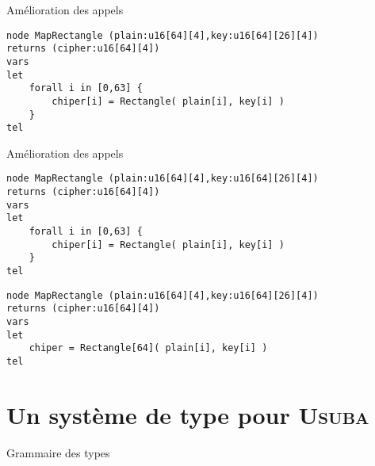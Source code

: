 \documentclass{beamer}
\newcommand{\Usuba}{\textsc{Usuba}}
\begin{document}
\begin{frame}[fragile]{Amélioration des appels}
\scriptsize
\begin{lstlisting}
node MapRectangle (plain:u16[64][4],key:u16[64][26][4])
returns (cipher:u16[64][4])
vars
let
    forall i in [0,63] {
        chiper[i] = Rectangle( plain[i], key[i] )
    }
tel
\end{lstlisting}

\end{frame}

\begin{frame}[fragile]{Amélioration des appels}
\scriptsize
\begin{lstlisting}
node MapRectangle (plain:u16[64][4],key:u16[64][26][4])
returns (cipher:u16[64][4])
vars
let
    forall i in [0,63] {
        chiper[i] = Rectangle( plain[i], key[i] )
    }
tel
\end{lstlisting}

\begin{lstlisting}
node MapRectangle (plain:u16[64][4],key:u16[64][26][4])
returns (cipher:u16[64][4])
vars
let
    chiper = Rectangle[64]( plain[i], key[i] )
tel
\end{lstlisting}
    
\end{frame}

\section{Un système de type pour \Usuba{}}

\begin{frame}{Grammaire des types}
\begin{figure}[t]
\end{figure}
\end{frame}
        
\end{document}
